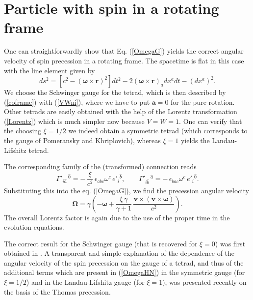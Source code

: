\documentclass[preprint,showpacs,preprintnumbers,amsmath,amssymb]{revtex4}
\begin{document}
\section{Particle with spin in a rotating frame}\label{rot}

One can straightforwardly show that Eq. (\ref{OmegaG}) yields the correct
angular velocity of spin precession in a rotating frame. The spacetime
is flat in this case with the line element \cite{HN} given by
\begin{equation}
ds^2 = \left[c^2 - (\bm{\omega}\times\bm r)^2\right]dt^2 - 2(\bm{\omega}
\times\bm r)_adx^adt - (dx^a)^2.\label{rotm}
\end{equation}
We choose the Schwinger gauge for the tetrad, which is then described by
(\ref{coframe}) with (\ref{VWni}), where we have to put ${\bm a} = 0$ for
the pure rotation. Other tetrads are easily obtained with the help of the
Lorentz transformation (\ref{Lorentz}) which is much simpler now because
$V = W = 1$. One can verify that the choosing $\xi = 1/2$ we indeed obtain
a symmetric tetrad (which corresponds to the gauge of Pomeransky and
Khriplovich), whereas $\xi = 1$ yields the Landau-Lifshitz tetrad.

The corresponding family of the (transformed) connection reads
\begin{equation}
\Gamma{}'_{i\widehat{a}}{\,}^{\widehat{0}} = -\,{\frac \xi{c^2}}
\,\epsilon_{abc}\omega^c\,e'_i{}^{\widehat{b}},\qquad
\Gamma{}'_{i\widehat{b}}{\,}^{\widehat{a}} = -\,\epsilon_{bac}
\omega^c\,e'_i{}^{\widehat{0}}.\label{conHN}
\end{equation}
Substituting this into the eq. (\ref{OmegaG}), we find the precession
angular velocity
\begin{equation}
{\bm\Omega} = \gamma\left(- {\bm\omega} + {\frac {\xi\,\gamma}{\gamma + 1}}
\,{\frac {\bm{v}\times(\bm{v}\times\bm\omega)}{c^2}}\right).\label{OmegaHN}
\end{equation}
The overall Lorentz factor is again due to the use of the proper time
in the evolution equations.

The correct result for the Schwinger gauge (that is recovered for $\xi = 0$)
was first obtained in \cite{Gor,Mashhoon}. A transparent and simple explanation
of the dependence of the angular velocity of the spin precession on the
gauge of a tetrad, and thus of the additional terms which are present in
(\ref{OmegaHN}) in the symmetric gauge (for $\xi = 1/2$) and in the
Landau-Lifshitz gauge (for $\xi = 1$), was presented recently \cite{Warszawa}
on the basis of the Thomas precession.
\end{document}
